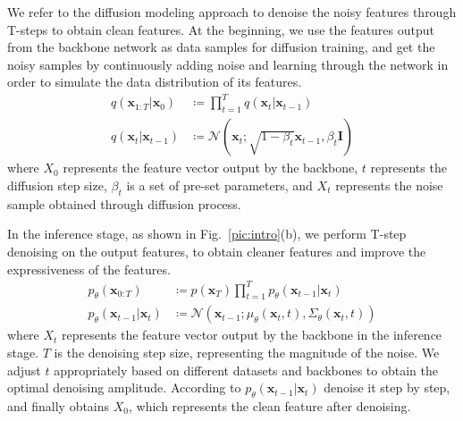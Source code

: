 \documentclass[conference]{IEEEtran}
\begin{document}
{We refer to the diffusion modeling approach to denoise the noisy features through T-steps to obtain clean features. At the beginning, we use the features output from the backbone network as data samples for diffusion training, and get the noisy samples by continuously adding noise and learning through the network in order to simulate the data distribution of its features. 
%
\begin{align}
q(\mathbf{x}_{1:T} | \mathbf{x}_0) &\coloneqq \prod_{t=1}^T q(\mathbf{x}_t | \mathbf{x}_{t-1}) \qquad \\
q(\mathbf{x}_t|\mathbf{x}_{t-1}) &\coloneqq \mathcal{N}(\mathbf{x}_t; \sqrt{1-\beta_t}\mathbf{x}_{t-1}, \beta_t \mathbf{I}) \label{eq:forwardprocess}
\end{align}
where $X_0$ represents the feature vector output by the backbone, $t$ represents the diffusion step size, $\beta_t$ is a set of pre-set parameters, and $X_t$ represents the noise sample obtained through diffusion process.

%
In the inference stage, as shown in Fig.~\ref{pic:intro}(b), we perform T-step denoising on the output features, to obtain cleaner features and improve the expressiveness of the features.
\begin{align}
  p_\theta(\mathbf{x}_{0:T}) &\coloneqq p(\mathbf{x}_T)\prod_{t=1}^T p_\theta(\mathbf{x}_{t-1}|\mathbf{x}_t) \\ 
  p_\theta(\mathbf{x}_{t-1}|\mathbf{x}_t) &\coloneqq \mathcal{N}(\mathbf{x}_{t-1}; \mu_\theta(\mathbf{x}_t, t), \Sigma_\theta(\mathbf{x}_t, t))
\end{align}
where $X_t$ represents the feature vector output by the backbone in the inference stage. $T$ is the denoising step size, representing the magnitude of the noise. We adjust $t$ appropriately based on different datasets and backbones to obtain the optimal denoising amplitude.
According to $p_\theta(\mathbf{x}_{t-1}|\mathbf{x}_t)$ denoise it step by step, and finally obtains $X_0$, which represents the clean feature after denoising.



\label{sec:methods ED Module}




}
\end{document}
